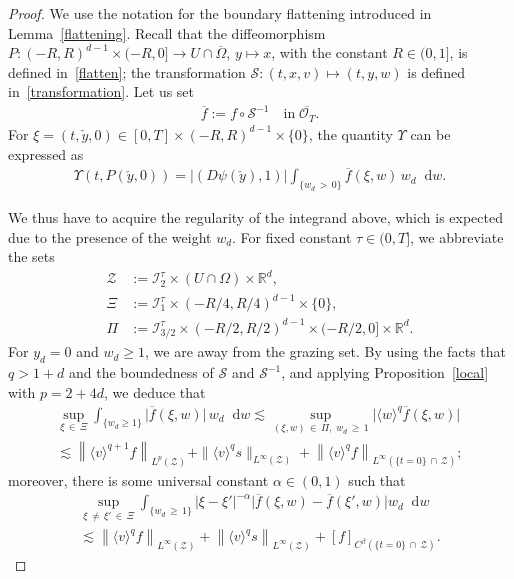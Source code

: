 \documentclass[10pt]{amsart}
\theoremstyle{definition}\newtheorem{defi}[theo]{Definition}\newtheorem{rema}[theo]{Remark}\newtheorem{exam}[theo]{Example}\newtheorem{exem}[theo]{Example}\newtheorem{nota}[theo]{Notation}
\newcommand*{\dif}{\mathop{}\!\mathrm{d}}
\newcommand*\R {\mathbb{R}}
\newcommand*\I {\mathcal{I}}
\renewcommand*\SS {\mathcal{S}}
\newcommand*\Z {\mathcal{Z}}
\newcommand*\OO {\mathcal{O}}
\newcommand{\la}{\langle}
\newcommand{\ra}{\rangle}
\newcommand{\lv}{\langle v\rangle}
\begin{document}
\begin{proof}
We use the notation for the boundary flattening introduced in Lemma~\ref{flattening}. Recall that the diffeomorphism $P:(-R,R)^{d-1}\times(-R,0]\rightarrow U\cap\overline{\Omega}$, $y\mapsto x$, with the constant $R\in(0,1]$, is defined in~\eqref{flatten}; the transformation $\SS:(t,x,v)\mapsto(t,y,w)$ is defined in~\eqref{transformation}. Let us set
\begin{align*}
\overline{f}:=f\circ\SS^{-1} \quad\text{in}\; \overline{\OO_T}.
\end{align*}
For $\xi=(t,\check{y},0)\in [0,T]\times(-R,R)^{d-1}\times\{0\}$, the quantity $\Upsilon$ can be expressed as
\begin{align*}
\Upsilon(t,P(\check{y},0)) =|(D\psi(\check{y}),1)| \int_{\{w_d\,>\,0\}} \overline{f}(\xi,w)\, w_d \dif w.
\end{align*}

We thus have to acquire the regularity of the integrand above, which is expected due to the presence of the weight $w_d$. For fixed constant $\tau\in(0,T]$, we abbreviate the sets
\begin{align*}
\Z&:=\I_2^\tau\times(U\cap\Omega)\times\R^d,\\
\Xi&:=\I_1^\tau\times(-R/4,R/4)^{d-1}\times\{0\}, \\
\Pi&:=\I_{3/2}^\tau\times(-R/2,R/2)^{d-1}\times(-R/2,0]\times\R^d.
\end{align*}
For $y_d=0$ and $w_d\ge1$, we are away from the grazing set. By using the facts that $q>1+d$ and the boundedness of $\SS$ and $\SS^{-1}$, and applying Proposition~\ref{local} with $p=2+4d$, we deduce that
\begin{multline}\label{w10}
\sup_{\xi\,\in\,\Xi}\int_{\{w_d\ge1\}} \big|\overline{f}(\xi,w)\big|\, w_d \dif w
\lesssim \sup_{(\xi,w)\,\in\,\Pi,\;\! w_d\,\ge\,1}\big|\la w\ra^q\overline{f}(\xi,w)\big|\\
\lesssim \left\|\lv^{q+1}f\right\|_{L^p(\Z)} + \|\lv^{q}s\|_{L^\infty(\Z)} + \left\|\lv^{q}f\right\|_{L^\infty(\{t=0\}\,\cap\,\Z)};
\end{multline}
moreover, there is some universal constant $\alpha\in(0,1)$ such that
\begin{multline}\label{w11}
\sup_{\xi\,\neq\,\xi'\,\in\,\Xi}\int_{\{w_d\,\ge\,1\}} \left|\xi-\xi'\right|^{-\alpha}\big|\overline{f}(\xi,w)-\overline{f}(\xi',w)\big| w_d \dif w\\
\lesssim \left\|\lv^{q}f\right\|_{L^\infty(\Z)} + \left\|\lv^{q}s\right\|_{L^\infty(\Z)} + [f]_{C^\beta(\{t=0\}\,\cap\,\Z)}.
\end{multline}


\end{proof}
\end{document}
